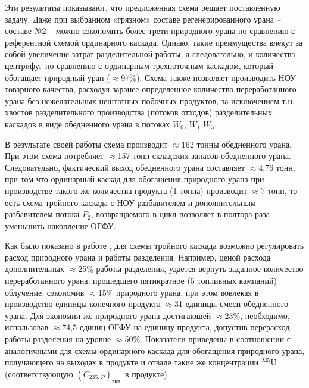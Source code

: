 Эти результаты показывают, что предложенная схема решает поставленную задачу. Даже при выбранном «грязном» составе регенерированного урана -- составе №2 -- можно сэкономить более трети природного урана  по сравнению с референтной схемой ординарного каскада. Однако, такие преимущества влекут за собой увеличение затрат разделительной работы, а следовательно, и количества центрифуг по сравнению с ординарным трехпоточным каскадом, который обогащает природный уран ($\approx$97\%). Схема также позволяет производить НОУ товарного качества, расходуя заранее определенное количество переработанного урана без нежелательных нештатных побочных продуктов, за исключением т.н. хвостов разделительного производства (потоков отходов) разделительных каскадов в виде обедненного урана в потоках $W_0$, $W_1$ $W_3$.

В результате своей работы схема производит $\approx$162 тонны обедненного урана. При этом схема потребляет $\approx$157 тонн складских запасов обедненного урана. Следовательно, фактический выход обедненного урана составляет $\approx$4,76 тонн, при том что ординарный каскад для обогащения природного урана при производстве такого же количества продукта (1 тонна) производит $\approx$7 тонн, то есть схема тройного каскада с НОУ-разбавителем и дополнительным разбавителем потока $P_2$, возвращаемого в цикл позволяет в полтора раза уменьшить накопление ОГФУ.


Как было показано в работе \cite{gusevMultycascadeEnrichmentSchemes2020}, для схемы тройного каскада возможно регулировать расход природного урана и работы разделения. Например, ценой расхода дополнительных $\approx$25\% работы разделения, удается вернуть заданное количество переработанного урана, прошедшего пятикратное (5 топливных кампаний) облучение, сэкономив $\approx$15\% природного урана, при этом вовлекая в производство единицы конечного продукта $\approx$31 единицы смеси обедненного урана. Для экономии же природного урана достигающей $\approx$23\%, необходимо, использовав $\approx$74,5 единиц ОГФУ на единицу продукта, допустив перерасход работы разделения на  уровне $\approx$50\%. Показатели приведены в соотношении с аналогичными для схемы ординарного каскада для обогащения природного урана, получающего на выходах в продукте и отвале такие же концентрации $^{235}$U (соответствующую $(C_{235,P})_\textit{экв.}$ в продукте).










